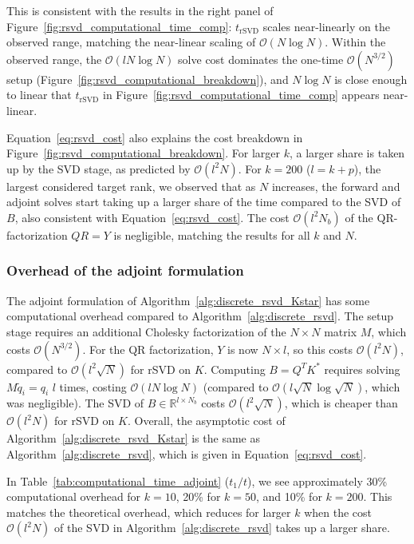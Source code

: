 This is consistent with the results in the right panel of Figure~\ref{fig:rsvd_computational_time_comp}: $t_{\text{rSVD}}$ scales near-linearly on the observed range, matching the near-linear scaling of $\mathcal{O}(N \log N)$. Within the observed range, the $\mathcal{O}(lN\log N)$ solve cost dominates the one-time $\mathcal{O}(N^{3/2})$ setup (Figure~\ref{fig:rsvd_computational_breakdown}), and $N\log N$ is close enough to linear that $t_{\text{rSVD}}$ in Figure~\ref{fig:rsvd_computational_time_comp} appears near-linear.

Equation~\eqref{eq:rsvd_cost} also explains the cost breakdown in Figure~\ref{fig:rsvd_computational_breakdown}. For larger $k$, a larger share is taken up by the SVD stage, as predicted by $\mathcal{O}(l^2 N)$. For $k = 200$ ($l = k + p$), the largest considered target rank, we observed that as $N$ increases, the forward and adjoint solves start taking up a larger share of the time compared to the SVD of $B$, also consistent with Equation~\eqref{eq:rsvd_cost}. The cost $\mathcal{O}(l^2 N_b)$ of the QR-factorization $QR = Y$ is negligible, matching the results for all $k$ and $N$.


\subsubsection{Overhead of the adjoint formulation}
The adjoint formulation of Algorithm~\ref{alg:discrete_rsvd_Kstar} has some computational overhead compared to Algorithm~\ref{alg:discrete_rsvd}. The setup stage requires an additional Cholesky factorization of the $N \times N$ matrix $M$, which costs $\mathcal{O}(N^{3/2})$. For the QR factorization, $Y$ is now $N \times l$, so this costs $\mathcal{O}(l^2 N)$, compared to $\mathcal{O}(l^2 \sqrt{N})$ for rSVD on $K$. Computing $B = Q^T K^*$ requires solving $M \tilde q_i = q_i$ $l$ times, costing $\mathcal{O}(l N \log N)$ (compared to $\mathcal{O}(l \sqrt{N} \log \sqrt{N})$, which was negligible). The SVD of $B \in \mathbb{R}^{l \times N_b}$ costs $\mathcal{O}(l^2 \sqrt{N})$, which is cheaper than $\mathcal{O}(l^2 N)$ for rSVD on $K$. Overall, the asymptotic cost of Algorithm~\ref{alg:discrete_rsvd_Kstar} is the same as Algorithm~\ref{alg:discrete_rsvd}, which is given in Equation~\eqref{eq:rsvd_cost}.

In Table~\ref{tab:computational_time_adjoint} ($t_1/t$), we see approximately 30\% computational overhead for $k = 10$, 20\% for $k = 50$, and 10\% for $k = 200$. This matches the theoretical overhead, which reduces for larger $k$ when the cost $\mathcal{O}(l^2 N)$ of the SVD in Algorithm~\ref{alg:discrete_rsvd} takes up a larger share.

